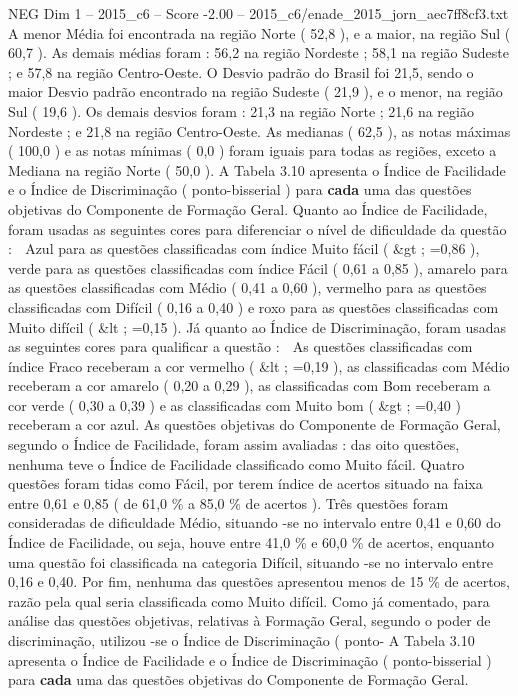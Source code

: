 \begin{textsample}{NEG Dim 1 – 2015\_c6 – Score -2.00 – 2015\_c6/enade\_2015\_jorn\_aec7ff8cf3.txt}
A menor Média foi encontrada na região Norte ( 52,8 ), e a maior, na região Sul ( 60,7 ).
As demais médias foram : 56,2 na região Nordeste ; 58,1 na região Sudeste ; e 57,8 na região Centro-Oeste.
O Desvio padrão do Brasil foi 21,5, sendo o maior Desvio padrão encontrado na região Sudeste ( 21,9 ), e o menor, na região Sul ( 19,6 ).
Os demais desvios foram : 21,3 na região Norte ; 21,6 na região Nordeste ; e 21,8 na região Centro-Oeste.
As medianas ( 62,5 ), as notas máximas ( 100,0 ) e as notas mínimas ( 0,0 ) foram iguais para todas as regiões, exceto a Mediana na região Norte ( 50,0 ).
A Tabela 3.10 apresenta o Índice de Facilidade e o Índice de Discriminação ( ponto-bisserial ) para \textbf{cada} uma das questões objetivas do Componente de Formação Geral.
Quanto ao Índice de Facilidade, foram usadas as seguintes cores para diferenciar o nível de dificuldade da questão :  Azul para as questões classificadas com índice Muito fácil ( \&gt ; =0,86 ), verde para as questões classificadas com índice Fácil ( 0,61 a 0,85 ), amarelo para as questões classificadas com Médio ( 0,41 a 0,60 ), vermelho para as questões classificadas com Difícil ( 0,16 a 0,40 ) e roxo para as questões classificadas com Muito difícil ( \&lt ; =0,15 ).
Já quanto ao Índice de Discriminação, foram usadas as seguintes cores para qualificar a questão :  As questões classificadas com índice Fraco receberam a cor vermelho ( \&lt ; =0,19 ), as classificadas com Médio receberam a cor amarelo ( 0,20 a 0,29 ), as classificadas com Bom receberam a cor verde ( 0,30 a 0,39 ) e as classificadas com Muito bom ( \&gt ; =0,40 ) receberam a cor azul.
As questões objetivas do Componente de Formação Geral, segundo o Índice de Facilidade, foram assim avaliadas : das oito questões, nenhuma teve o Índice de Facilidade classificado como Muito fácil.
Quatro questões foram tidas como Fácil, por terem índice de acertos situado na faixa entre 0,61 e 0,85 ( de 61,0 \% a 85,0 \% de acertos ).
Três questões foram consideradas de dificuldade Médio, situando -se no intervalo entre 0,41 e 0,60 do Índice de Facilidade, ou seja, houve entre 41,0 \% e 60,0 \% de acertos, enquanto uma questão foi classificada na categoria Difícil, situando -se no intervalo entre 0,16 e 0,40.
Por fim, nenhuma das questões apresentou menos de 15 \% de acertos, razão pela qual seria classificada como Muito difícil.
Como já comentado, para análise das questões objetivas, relativas à Formação Geral, segundo o poder de discriminação, utilizou -se o Índice de Discriminação ( ponto- A Tabela 3.10 apresenta o Índice de Facilidade e o Índice de Discriminação ( ponto-bisserial ) para \textbf{cada} uma das questões objetivas do Componente de Formação Geral.

\end{textsample}
